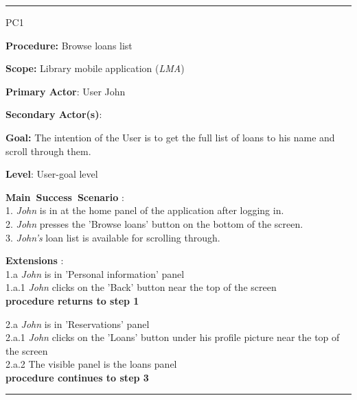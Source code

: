 \vspace{0.5cm}
\hrule
\begin{lyxlist}{PC1}
\small{
\item [\textbf{Procedure:}] Browse loans list
\item [\textbf{Scope:}] Library mobile application (\emph{LMA})
\item [\textbf{Primary Actor}:] User John
\item [\textbf{Secondary Actor(s)}:] 
\item [\textbf{Goal:}] The intention of the User is to get the full list of
loans to his name and scroll through them.
\item [\textbf{Level}:] User-goal level
\item [\textbf{Main~Success~Scenario}]:\\
1. \emph{John} is in at the home panel of the application after logging in.\\
2. \emph{John} presses the 'Browse loans' button on the bottom of the screen.\\
3. \emph{John's} loan list is available for scrolling through.\\

\item [\textbf{Extensions}]:\\
1.a \emph{John} is in 'Personal information' panel\\
\hspace*{0.5cm} 1.a.1 \emph{John} clicks on the 'Back' button near the top of
the screen\\
\hspace*{0.5cm} \textbf{procedure returns to step 1}

2.a \emph{John} is in 'Reservations' panel\\
\hspace*{0.5cm} 2.a.1 \emph{John} clicks on the 'Loans' button under his
profile picture near the top of the screen\\
\hspace*{0.5cm} 2.a.2 The visible panel is the loans panel\\
\hspace*{0.5cm} \textbf{procedure continues to step 3}

}

\end{lyxlist}
\hrule


